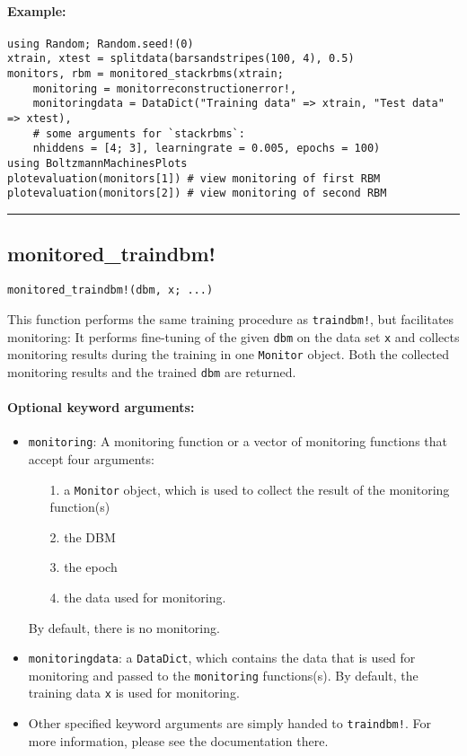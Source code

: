 \paragraph*{Example:}
\begin{verbatim}
using Random; Random.seed!(0)
xtrain, xtest = splitdata(barsandstripes(100, 4), 0.5)
monitors, rbm = monitored_stackrbms(xtrain;
    monitoring = monitorreconstructionerror!,
    monitoringdata = DataDict("Training data" => xtrain, "Test data" => xtest),
    # some arguments for `stackrbms`:
    nhiddens = [4; 3], learningrate = 0.005, epochs = 100)
using BoltzmannMachinesPlots
plotevaluation(monitors[1]) # view monitoring of first RBM
plotevaluation(monitors[2]) # view monitoring of second RBM
\end{verbatim}
\noindent\rule{\textwidth}{1pt}
\subsection*{monitored\_traindbm!}  \label{bms_monitored_traindbm!}
\begin{verbatim}
monitored_traindbm!(dbm, x; ...)
\end{verbatim}
This function performs the same training procedure as \texttt{traindbm!}, but facilitates monitoring: It performs fine-tuning of the given \texttt{dbm} on the data set \texttt{x} and collects monitoring results during the training in one \texttt{Monitor} object. Both the collected monitoring results and the trained \texttt{dbm} are returned.

\paragraph*{Optional keyword arguments:}
\begin{itemize}
\item \texttt{monitoring}: A monitoring function or a vector of monitoring functions that accept four arguments:

\begin{itemize}
\item[1. ] a \texttt{Monitor} object, which is used to collect the result of the monitoring function(s)


\item[2. ] the DBM


\item[3. ] the epoch


\item[4. ] the data used for monitoring.

\end{itemize}
By default, there is no monitoring.


\item \texttt{monitoringdata}: a \texttt{DataDict}, which contains the data that is used for  monitoring and passed to the \texttt{monitoring} functions(s).  By default, the training data \texttt{x} is used for monitoring.


\item Other specified keyword arguments are simply handed to \texttt{traindbm!}. For more information, please see the documentation there.

\end{itemize}
